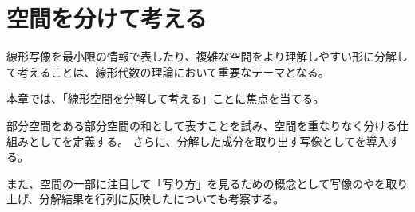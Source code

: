 \documentclass[../../../topic_linear-algebra]{subfiles}
\begin{document}
\sectionline
\section{空間を分けて考える}

線形写像を最小限の情報で表したり、複雑な空間をより理解しやすい形に分解して考えることは、線形代数の理論において重要なテーマとなる。

\br

本章では、「線形空間を分解して考える」ことに焦点を当てる。

\br

部分空間をある部分空間の和として表すことを試み、空間を重なりなく分ける仕組みとしてを定義する。
さらに、分解した成分を取り出す写像としてを導入する。

\br

また、空間の一部に注目して「写り方」を見るための概念として写像のやを取り上げ、分解結果を行列に反映したについても考察する。
\end{document}
